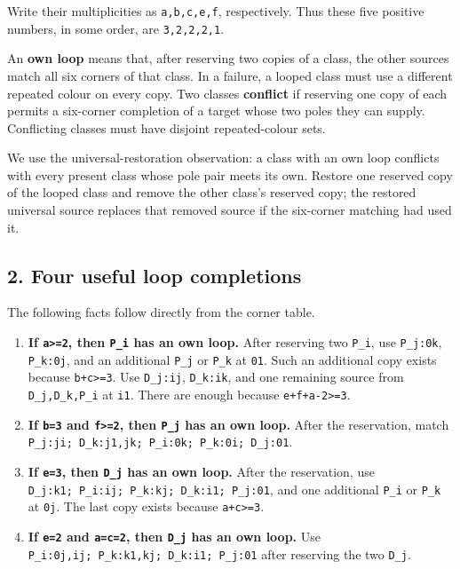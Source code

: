 \documentclass[
  10pt,
]{article}
\providecommand{\tightlist}{%
  \setlength{\itemsep}{0pt}\setlength{\parskip}{0pt}}
\begin{document}
Write their multiplicities as \texttt{a,b,c,e,f}, respectively. Thus
these five positive numbers, in some order, are \texttt{3,2,2,2,1}.

An \textbf{own loop} means that, after reserving two copies of a class,
the other sources match all six corners of that class. In a failure, a
looped class must use a different repeated colour on every copy. Two
classes \textbf{conflict} if reserving one copy of each permits a
six-corner completion of a target whose two poles they can supply.
Conflicting classes must have disjoint repeated-colour sets.

We use the universal-restoration observation: a class with an own loop
conflicts with every present class whose pole pair meets its own.
Restore one reserved copy of the looped class and remove the other
class's reserved copy; the restored universal source replaces that
removed source if the six-corner matching had used it.

\hypertarget{four-useful-loop-completions}{%
\subsection*{2. Four useful loop
completions}\label{four-useful-loop-completions}}

The following facts follow directly from the corner table.

\begin{enumerate}
\def\labelenumi{\arabic{enumi}.}
\tightlist
\item
  \textbf{If \texttt{a\textgreater{}=2}, then \texttt{P\_i} has an own
  loop.} After reserving two \texttt{P\_i}, use \texttt{P\_j:0k},
  \texttt{P\_k:0j}, and an additional \texttt{P\_j} or \texttt{P\_k} at
  \texttt{01}. Such an additional copy exists because
  \texttt{b+c\textgreater{}=3}. Use \texttt{D\_j:ij}, \texttt{D\_k:ik},
  and one remaining source from \texttt{D\_j,D\_k,P\_i} at \texttt{i1}.
  There are enough because \texttt{e+f+a-2\textgreater{}=3}.
\item
  \textbf{If \texttt{b=3} and \texttt{f\textgreater{}=2}, then
  \texttt{P\_j} has an own loop.} After the reservation, match
  \texttt{P\_j:ji;\ D\_k:j1,jk;\ P\_i:0k;\ P\_k:0i;\ D\_j:01}.
\item
  \textbf{If \texttt{e=3}, then \texttt{D\_j} has an own loop.} After
  the reservation, use
  \texttt{D\_j:k1;\ P\_i:ij;\ P\_k:kj;\ D\_k:i1;\ P\_j:01}, and one
  additional \texttt{P\_i} or \texttt{P\_k} at \texttt{0j}. The last
  copy exists because \texttt{a+c\textgreater{}=3}.
\item
  \textbf{If \texttt{e=2} and \texttt{a=c=2}, then \texttt{D\_j} has an
  own loop.} Use \texttt{P\_i:0j,ij;\ P\_k:k1,kj;\ D\_k:i1;\ P\_j:01}
  after reserving the two \texttt{D\_j}.
\end{enumerate}
\end{document}
